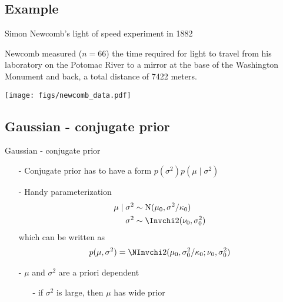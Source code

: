 \documentclass[10pt]{beamer}
\begin{document}
\subsection{Example}

\begin{frame}{Simon Newcomb's light of speed experiment in 1882}

  {\small
  Newcomb measured ($n=66$) the time required for light to travel from
  his laboratory on the Potomac River to a mirror at the base of the
  Washington Monument and back, a total distance of 7422 meters.}
  \begin{center}
    \vspace{-0.5\baselineskip}
    {\texttt{[image: figs/newcomb\_data.pdf]}}\\
    \vspace{-1\baselineskip}
  \end{center}

\end{frame}

\subsection{Gaussian - conjugate prior}

\begin{frame}{Gaussian - conjugate prior}

  \begin{itemize}
  \item[-] Conjugate prior has to have a form
    $p(\sigma^2)p(\mu \mid \sigma^2)$\\
    \pause
  \item[-] Handy parameterization
    \begin{align*}
      \mu \mid \sigma^2 & \sim \mathrm{N}(\mu_0,\sigma^2/\kappa_0)\\
      \sigma^2 & \sim \Invchi2(\nu_0,\sigma_0^2)
    \end{align*}
    which can be written as
    \begin{align*}
      p(\mu,\sigma^2)=\NInvchi2(\mu_0,\sigma_0^2/\kappa_0;\nu_0,\sigma_0^2)
    \end{align*}
    \pause
  \item[-] $\mu$ and $\sigma^2$ are a priori dependent
    \begin{itemize}
      \item[-] if $\sigma^2$ is large, then $\mu$ has wide prior
    \end{itemize}
  \end{itemize}

\end{frame}
\end{document}
